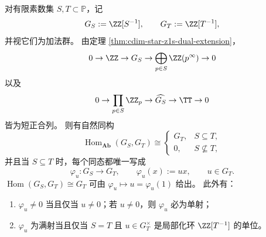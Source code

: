 \begin{theorem}\label{thm:xi-localized-integers-hom-classification}
对有限素数集 \(S,T\subset\mathbb P\)，记
\[
G_S:=\ZZ[S^{-1}],
\qquad
G_T:=\ZZ[T^{-1}],
\]
并视它们为加法群。
由定理 \ref{thm:cdim-star-z1s-dual-extension}，
\[
0\to \ZZ\to G_S\to \bigoplus_{p\in S}\ZZ(p^\infty)\to 0
\]
以及
\[
0\to \prod_{p\in S}\ZZ_p\to \widehat{G_S}\to \TT\to 0
\]
皆为短正合列。
则有自然同构
\[
\boxed{\;
\operatorname{Hom}_{\mathbf{Ab}}(G_S,G_T)\cong
\begin{cases}
G_T,& S\subseteq T,\\[1mm]
0,& S\not\subseteq T,
\end{cases}\;}
\]
并且当 \(S\subseteq T\) 时，每个同态都唯一写成
\[
\varphi_u:G_S\to G_T,
\qquad
\varphi_u(x):=ux,
\qquad
u\in G_T.
\]
\(\operatorname{Hom}(G_S,G_T)\cong G_T\) 可由 \(\varphi_u\mapsto u=\varphi_u(1)\) 给出。
此外有：
\begin{enumerate}
  \item \(\varphi_u\neq 0\) 当且仅当 \(u\neq 0\)；若 \(u\neq 0\)，则 \(\varphi_u\) 必为单射；
  \item \(\varphi_u\) 为满射当且仅当 \(S=T\) 且 \(u\in G_T^\times\) 是局部化环 \(\ZZ[T^{-1}]\) 的单位。
\end{enumerate}
\end{theorem}
